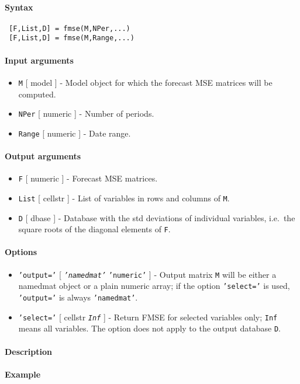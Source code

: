 


	\paragraph{Syntax}
 
 \begin{verbatim}
 [F,List,D] = fmse(M,NPer,...)
 [F,List,D] = fmse(M,Range,...)
 \end{verbatim}
 
 \paragraph{Input arguments}
 
 \begin{itemize}
 \item
   \texttt{M} {[} model {]} - Model object for which the forecast MSE
   matrices will be computed.
 \item
   \texttt{NPer} {[} numeric {]} - Number of periods.
 \item
   \texttt{Range} {[} numeric {]} - Date range.
 \end{itemize}
 
 \paragraph{Output arguments}
 
 \begin{itemize}
 \item
   \texttt{F} {[} numeric {]} - Forecast MSE matrices.
 \item
   \texttt{List} {[} cellstr {]} - List of variables in rows and columns
   of \texttt{M}.
 \item
   \texttt{D} {[} dbase {]} - Database with the std deviations of
   individual variables, i.e.~the square roots of the diagonal elements
   of \texttt{F}.
 \end{itemize}
 
 \paragraph{Options}
 
 \begin{itemize}
 \item
   \texttt{'output='} {[} \emph{\texttt{'namedmat'}} \textbar{}
   \texttt{'numeric'} {]} - Output matrix \texttt{M} will be either a
   namedmat object or a plain numeric array; if the option
   \texttt{'select='} is used, \texttt{'output='} is always
   \texttt{'namedmat'}.
 \item
   \texttt{'select='} {[} cellstr \textbar{} \emph{\texttt{Inf}} {]} -
   Return FMSE for selected variables only; \texttt{Inf} means all
   variables. The option does not apply to the output database
   \texttt{D}.
 \end{itemize}
 
 \paragraph{Description}
 
 \paragraph{Example}


